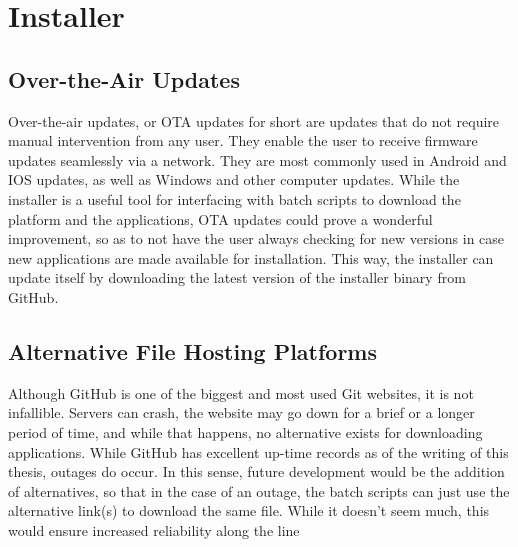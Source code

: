\section{Installer}
\subsection{Over-the-Air Updates}
Over-the-air updates, or OTA updates for short are updates that do not require manual intervention from any user. They enable the user to receive firmware updates seamlessly via a network. They are most commonly used in Android and IOS updates, as well as Windows and other computer updates.
\vspace{\baselineskip}\newline
While the installer is a useful tool for interfacing with batch scripts to download the platform and the applications, OTA updates could prove a wonderful improvement, so as to not have the user always checking for new versions in case new applications are made available for installation. This way, the installer can update itself by downloading the latest version of the installer binary from GitHub.

\subsection{Alternative File Hosting Platforms}
Although GitHub is one of the biggest and most used Git websites, it is not infallible. Servers can crash, the website may go down for a brief or a longer period of time, and while that happens, no alternative exists for downloading applications. While GitHub has excellent up-time records as of the writing of this thesis, outages do occur. In this sense, future development would be the addition of alternatives, so that in the case of an outage, the batch scripts can just use the alternative link(s) to download the same file. While it doesn't seem much, this would ensure increased reliability along the line 
